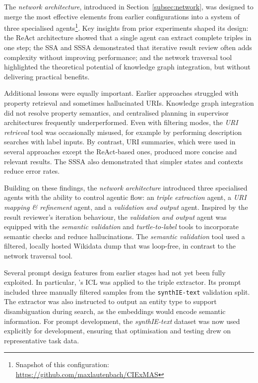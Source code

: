 \documentclass[a4paper,oneside,bibliography=totoc]{scrbook}
\begin{document}
The \textit{network architecture}, introduced in Section~\ref{subsec:network}, was designed to merge the most effective elements from earlier configurations into a system of three specialised agents\footnote{Snapshot of this configuration: \url{https://github.com/maxlautenbach/CIExMAS}}. Key insights from prior experiments shaped its design: the ReAct architecture showed that a single agent can extract complete triples in one step; the \ac{SSA} and \ac{SSSA} demonstrated that iterative result review often adds complexity without improving performance; and the network traversal tool highlighted the theoretical potential of knowledge graph integration, but without delivering practical benefits.

Additional lessons were equally important. Earlier approaches struggled with property retrieval and sometimes hallucinated URIs. Knowledge graph integration did not resolve property semantics, and centralised planning in supervisor architectures frequently underperformed. Even with filtering modes, the \textit{URI retrieval} tool was occasionally misused, for example by performing description searches with label inputs. By contrast, URI summaries, which were used in several approaches except the ReAct-based ones, produced more concise and relevant results. The \ac{SSSA} also demonstrated that simpler states and contexts reduce error rates.

Building on these findings, the \textit{network architecture} introduced three specialised agents with the ability to control agentic flow: an \textit{triple extraction} agent, a \textit{URI mapping \& refinement} agent, and a \textit{validation and output} agent. Inspired by the result reviewer’s iteration behaviour, the \textit{validation and output} agent was equipped with the \textit{semantic validation} and \textit{turtle-to-label} tools to incorporate semantic checks and reduce hallucinations. The \textit{semantic validation} tool used a filtered, locally hosted Wikidata dump that was loop-free, in contrast to the network traversal tool.

Several prompt design features from earlier stages had not yet been fully exploited. In particular, \citet{Brown2020}’s \ac{ICL} was applied to the triple extractor. Its prompt included three manually filtered samples from the \texttt{synthIE-text} validation split. The extractor was also instructed to output an entity type to support disambiguation during search, as the embeddings would encode semantic information. For prompt development, the \textit{synthIE-text} dataset was now used explicitly for development, ensuring that optimisation and testing drew on representative task data.
\end{document}
